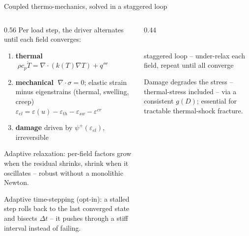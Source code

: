 \documentclass[aspectratio=169,11pt]{beamer}
\begin{document}
\begin{frame}{Coupled thermo-mechanics, solved in a staggered loop}
  \small
  \begin{columns}[T]
    \begin{column}{0.56\textwidth}
      Per load step, the driver alternates until each field converges:
      \begin{enumerate}
        \item \textbf{thermal} $\;\rho c_p \dot T = \nabla\!\cdot(k(T)\nabla T) + q'''$
        \item \textbf{mechanical} $\;\nabla\!\cdot\sigma = 0$; elastic strain minus
              \alert{eigenstrains} (thermal, swelling, \alert{creep})\\
              $\varepsilon_{el} = \varepsilon(u) - \varepsilon_{th} - \varepsilon_{sw} - \varepsilon^{cr}$
        \item \textbf{damage} driven by $\psi^+(\varepsilon_{el})$, irreversible
      \end{enumerate}
      \vspace{0.5em}
      \alert{Adaptive relaxation}: per-field factors grow when the residual
      shrinks, shrink when it oscillates -- robust without a monolithic Newton.
      \vspace{0.3em}

      {\scriptsize \alert{Adaptive time-stepping} (opt-in): a stalled step rolls
      back to the last converged state and bisects $\Delta t$ -- it pushes through
      a stiff interval instead of failing.}
    \end{column}
    \begin{column}{0.44\textwidth}
      \centering
      \\[3pt]
      {\tiny staggered loop -- under-relax each field, repeat until all converge}
      \vspace{0.6em}

      {\scriptsize Damage degrades the stress -- thermal-stress included --
      via a consistent $g(D)$; essential for tractable thermal-shock fracture.}
    \end{column}
  \end{columns}
\end{frame}
\end{document}
